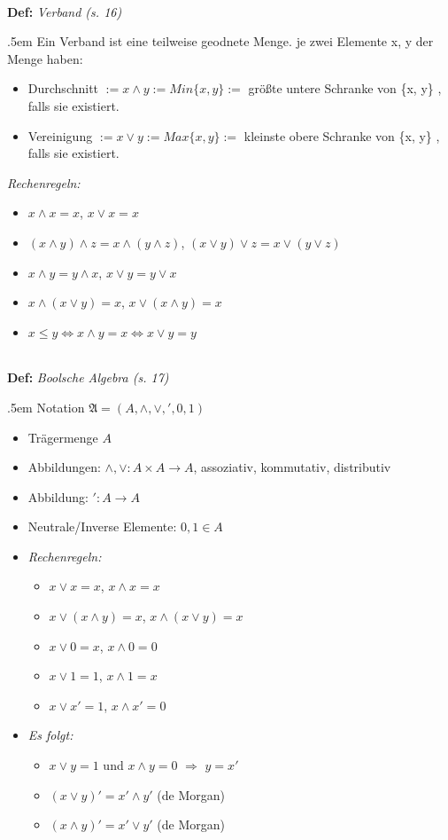 \documentclass[twocolumn, 10pt]{article}
\newenvironment {definition}
                [1][]
                {\noindent\\{\bf
                Def:}\emph{
                #1}\indent\begin{addmargin}{.5em}}{\end{addmargin}}
\newcommand{\und}{\wedge}
\newcommand{\oder}{\vee}
\begin{document}
\begin{definition}[Verband (s. 16)]
Ein Verband ist eine teilweise geodnete Menge. je zwei Elemente x, y der Menge
haben:
\begin{itemize}
  \item Durchschnitt $:= x \und y :=Min\{ x, y\} :=$ größte untere Schranke von
  \{x, y\} , falls sie existiert.
  \item Vereinigung $:=x \oder y :=Max\{ x, y\} :=$ kleinste obere Schranke von
  \{x, y\} , falls sie existiert.
\end{itemize}
\emph{Rechenregeln:}
\begin{itemize}
  \item $x \und x = x$, $x \oder x = x$
  \item $(x \und y) \und z = x \und (y \und z)$, $(x \oder y) \oder z = x \oder (y
  \oder z)$
  \item $x \und y = y \und x$, $x \oder y = y \oder x$
  \item $x \und (x \oder y) = x$, $x \oder (x \und y) = x$
  \item $x \leq y \Leftrightarrow x \und y = x \Leftrightarrow x\oder y = y$
\end{itemize}
\end{definition}

\begin{definition}[Boolsche Algebra (s. 17)]
Notation $\mathfrak{A}=(A, \und , \oder , ', 0, 1)$
\begin{itemize}
  \item Trägermenge $A$
  \item Abbildungen: $\und, \oder : A\times A \rightarrow A$, assoziativ,
  kommutativ, distributiv
  \item Abbildung: $': A \rightarrow A$
  \item Neutrale/Inverse Elemente: $0, 1 \in A$
  \item \emph{Rechenregeln:}\begin{itemize}
    \item $x \oder x = x$, $x \und x = x$
    \item $x \oder (x \und y) = x$, $x \und (x \oder y) = x$
    \item $x \oder 0 = x$, $x \und 0 = 0$
    \item $x \oder 1 = 1$, $x \und 1 = x$
    \item $x \oder x' = 1$, $x \und x' = 0$
  \end{itemize}
  \item \emph{Es folgt:} \begin{itemize}
    \item $x \oder y = 1$ und $x \und y = 0$ $\Longrightarrow$ $y = x'$
    \item $(x \oder y)' = x' \und y'$ (de Morgan)
    \item $(x \und y)' = x' \oder y'$ (de Morgan)
  \end{itemize}
\end{itemize}
\end{definition}
\end{document}
